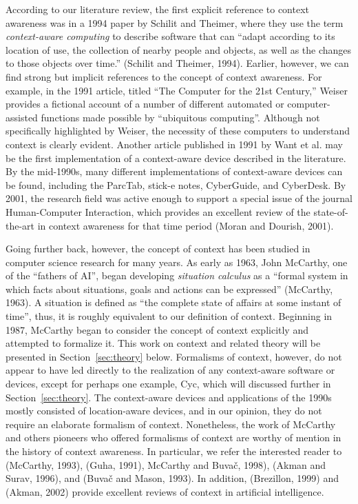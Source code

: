 According to our literature review, the first explicit reference to context awareness was in a 1994 paper by Schilit and Theimer, where they use the term \emph{context-aware computing} to describe software that can ``adapt according to its location of use, the collection of nearby people and objects, as well as the changes to those objects over time.'' (Schilit and Theimer, 1994). Earlier, however, we can find strong but implicit references to the concept of context awareness. For example, in the 1991 article, titled ``The Computer for the 21st Century,'' Weiser provides a fictional account of a number of different automated or computer-assisted functions made possible by ``ubiquitous computing''. Although not specifically highlighted by Weiser, the necessity of these computers to understand context is clearly evident. Another article published in 1991 by Want et al. may be the first implementation of a context-aware device described in the literature. By the mid-1990s, many different implementations of context-aware devices can be found, including the ParcTab, stick-e notes, CyberGuide, and CyberDesk. By 2001, the research field was active enough to support a special issue of the journal Human-Computer Interaction, which provides an excellent review of the state-of-the-art in context awareness for that time period (Moran and Dourish, 2001).

Going further back, however, the concept of context has been studied in computer science research for many years. As early as 1963, John McCarthy, one of the ``fathers of AI'', began developing \emph{situation calculus} as a ``formal system in which facts about situations, goals and actions can be expressed'' (McCarthy, 1963). A situation is defined as ``the complete state of affairs at some instant of time'', thus, it is roughly equivalent to our definition of context. Beginning in 1987, McCarthy began to consider the concept of context explicitly and attempted to formalize it. This work on context and related theory will be presented in Section~\ref{sec:theory} below. Formalisms of context, however, do not appear to have led directly to the realization of any context-aware software or devices, except for perhaps one example, Cyc, which will discussed further in Section~\ref{sec:theory}. The context-aware devices and applications of the 1990s mostly consisted of location-aware devices, and in our opinion, they do not require an elaborate formalism of context. Nonetheless, the work of McCarthy and others pioneers who offered formalisms of context are worthy of mention in the history of context awareness. In particular, we refer the interested reader to (McCarthy, 1993), (Guha, 1991), McCarthy and Buva\v{c}, 1998), (Akman and Surav, 1996), and (Buva\v{c} and Mason, 1993). In addition, (Brezillon, 1999) and (Akman, 2002) provide excellent reviews of context in artificial intelligence.

